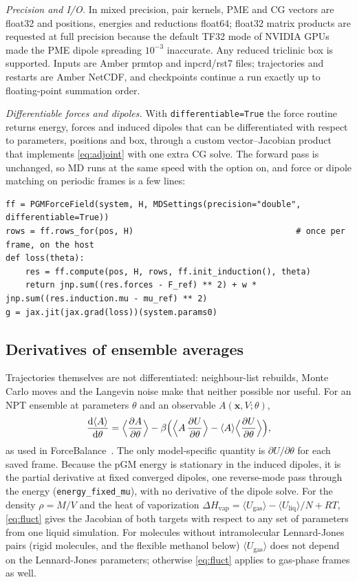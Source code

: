 \documentclass[11pt]{article}
\newcommand{\code}[1]{\texttt{#1}}
\newcommand{\dd}{\mathrm{d}}
\newcommand{\Hvap}{\Delta H_\mathrm{vap}}
\begin{document}
\emph{Precision and I/O.} In mixed precision, pair kernels, PME and CG vectors are float32 and
positions, energies and reductions float64; float32 matrix products are requested at full
precision because the default TF32 mode of NVIDIA GPUs made the PME dipole spreading
$10^{-3}$ inaccurate. Any reduced triclinic box is supported. Inputs are Amber prmtop and
inpcrd/rst7 files; trajectories and restarts are Amber NetCDF, and checkpoints continue a run
exactly up to floating-point summation order.

\emph{Differentiable forces and dipoles.} With \code{differentiable=True} the force routine
returns energy, forces and induced dipoles that can be differentiated with respect to parameters,
positions and box, through a custom vector--Jacobian product that implements \cref{eq:adjoint}
with one extra CG solve. The forward pass is unchanged, so MD runs at the same speed with the
option on, and force or dipole matching on periodic frames is a few lines:

\begin{lstlisting}
ff = PGMForceField(system, H, MDSettings(precision="double", differentiable=True))
rows = ff.rows_for(pos, H)                                 # once per frame, on the host
def loss(theta):
    res = ff.compute(pos, H, rows, ff.init_induction(), theta)
    return jnp.sum((res.forces - F_ref) ** 2) + w * jnp.sum((res.induction.mu - mu_ref) ** 2)
g = jax.jit(jax.grad(loss))(system.params0)
\end{lstlisting}

\subsection{Derivatives of ensemble averages}\label{sec:ensemble}
Trajectories themselves are not differentiated: neighbour-list rebuilds, Monte Carlo moves and
the Langevin noise make that neither possible nor useful. For an NPT ensemble at parameters
$\theta$ and an observable $A(\bm x,V;\theta)$,
\begin{equation}\label{eq:fluct}
\frac{\dd\langle A\rangle}{\dd\theta}=\Bigl\langle\frac{\partial A}{\partial\theta}\Bigr\rangle
-\beta\Bigl(\Bigl\langle A\,\frac{\partial U}{\partial\theta}\Bigr\rangle
-\langle A\rangle\Bigl\langle\frac{\partial U}{\partial\theta}\Bigr\rangle\Bigr),
\end{equation}
as used in ForceBalance~\cite{wang2014forcebalance}. The only model-specific quantity is
$\partial U/\partial\theta$ for each saved frame. Because the pGM energy is stationary in the
induced dipoles, it is the partial derivative at fixed converged dipoles, one reverse-mode pass
through the energy (\code{energy\_fixed\_mu}), with no derivative of the dipole solve. For the
density $\rho=M/V$ and the heat of vaporization
$\Hvap=\langle U_\mathrm{gas}\rangle-\langle U_\mathrm{liq}\rangle/N+RT$, \cref{eq:fluct} gives the
Jacobian of both targets with respect to any set of parameters from one liquid simulation. For
molecules without intramolecular Lennard-Jones pairs (rigid molecules, and the flexible methanol
below) $\langle U_\mathrm{gas}\rangle$ does not depend on the Lennard-Jones parameters; otherwise
\cref{eq:fluct} applies to gas-phase frames as well.
\end{document}
